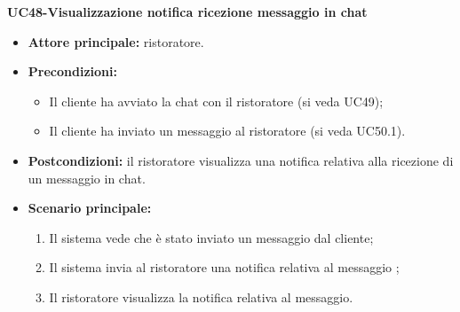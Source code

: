 \textbf{UC48-Visualizzazione notifica ricezione messaggio in chat}
\begin{itemize}
\item \textbf{Attore principale:} ristoratore.
\item \textbf{Precondizioni:}
\begin{itemize}
    \item Il cliente ha avviato la chat con il ristoratore (si veda UC49);
    \item Il cliente ha inviato un messaggio al ristoratore (si veda UC50.1).
\end{itemize}
\item \textbf{Postcondizioni:} il ristoratore visualizza una notifica relativa alla ricezione di un messaggio in chat.
\item \textbf{Scenario principale:}
\begin{enumerate}
    \item Il sistema vede che è stato inviato un messaggio dal cliente;
    \item Il sistema invia al ristoratore una notifica relativa al messaggio ;
    \item Il ristoratore visualizza la notifica relativa al messaggio.
\end{enumerate}
\end{itemize}


